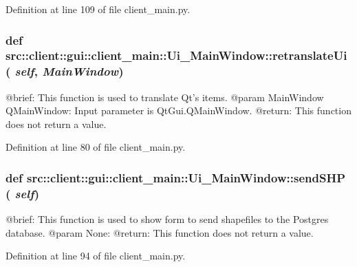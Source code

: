 Definition at line 109 of file client\_\-main.py.

\hypertarget{classsrc_1_1client_1_1gui_1_1client__main_1_1Ui__MainWindow_af5e5ea9f5cc29c2b5bcc37ddf66a43d4}{
\subsubsection[{retranslateUi}]{\setlength{\rightskip}{0pt plus 5cm}def src::client::gui::client\_\-main::Ui\_\-MainWindow::retranslateUi ( {\em self}, \/   {\em MainWindow})}}
\label{classsrc_1_1client_1_1gui_1_1client__main_1_1Ui__MainWindow_af5e5ea9f5cc29c2b5bcc37ddf66a43d4}
\begin{DoxyVerb}
@brief: This function is used to translate Qt's items.
@param MainWindow QMainWindow: Input parameter is QtGui.QMainWindow.
@return: This function does not return a value.
\end{DoxyVerb}
 

Definition at line 80 of file client\_\-main.py.

\hypertarget{classsrc_1_1client_1_1gui_1_1client__main_1_1Ui__MainWindow_a0fd7a48cc70a1a254165b6388b57ab8a}{
\subsubsection[{sendSHP}]{\setlength{\rightskip}{0pt plus 5cm}def src::client::gui::client\_\-main::Ui\_\-MainWindow::sendSHP ( {\em self})}}
\label{classsrc_1_1client_1_1gui_1_1client__main_1_1Ui__MainWindow_a0fd7a48cc70a1a254165b6388b57ab8a}
\begin{DoxyVerb}
@brief: This function is used to show form to send shapefiles to the Postgres database.
@param None:
@return: This function does not return a value.
\end{DoxyVerb}
 

Definition at line 94 of file client\_\-main.py.

